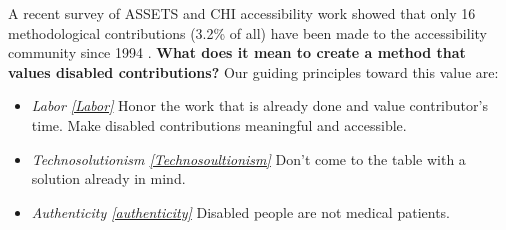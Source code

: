 A recent survey of ASSETS and CHI accessibility work showed that only 16 methodological contributions (3.2\% of all)  have been made to the accessibility community since 1994  \cite{mackWhatWeMean2021}.
\textbf{What does it mean to create a method that values disabled contributions? } Our guiding principles toward this value are: 
\begin{itemize}
\item  \textit{Labor \ref{Labor}} Honor the work that is already done and value contributor's time. Make disabled contributions meaningful and accessible.
\item \textit{Technosolutionism \ref{Technosoultionism}} Don't come to the table with a solution already in mind. 
\item \textit{Authenticity \ref{authenticity}} Disabled people are not medical patients. 
\end{itemize}

